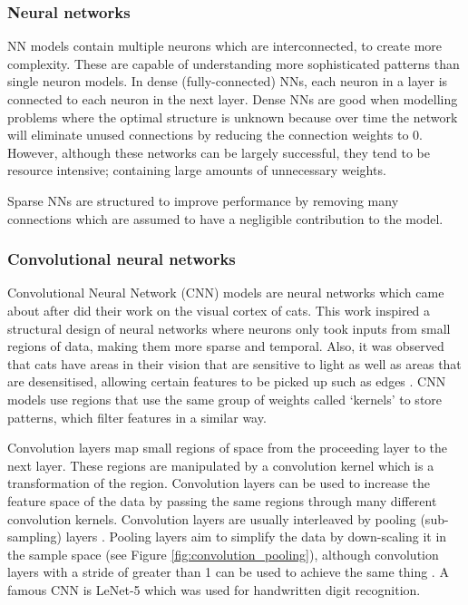 \documentclass[12pt]{article}
\begin{document}
	\subsubsection{Neural networks}
	\label{sec:neural_networks2}
	
	NN models contain multiple neurons which are interconnected, to create more complexity. These are capable of understanding more sophisticated patterns than single neuron models. In dense (fully-connected) NNs, each neuron in a layer is connected to each neuron in the next layer. Dense NNs are good when modelling problems where the optimal structure is unknown because over time the network will eliminate unused connections by reducing the connection weights to 0. However, although these networks can be largely successful, they tend to be resource intensive; containing large amounts of unnecessary weights.\medskip
	
	Sparse NNs are structured to improve performance by removing many connections which are assumed to have a negligible contribution to the model.\medskip
	
	\subsubsection{Convolutional neural networks}
	\label{sec:cnns}
	Convolutional Neural Network (CNN) models are neural networks which came about after \textcite{Hubel1959} did their work on the visual cortex of cats. This work inspired a structural design of neural networks where neurons only took inputs from small regions of data, making them more sparse and temporal. Also, it was observed that cats have areas in their vision that are sensitive to light as well as areas that are desensitised, allowing certain features to be picked up such as edges \parencite[p574]{Hubel1959}. CNN models use regions that use the same group of weights called `kernels' to store patterns, which filter features in a similar way.\medskip
	
	Convolution layers map small regions of space from the proceeding layer to the next layer. These regions are manipulated by a convolution kernel which is a transformation of the region. Convolution layers can be used to increase the feature space of the data by passing the same regions through many different convolution kernels. Convolution layers are usually interleaved by pooling (sub-sampling) layers \parencite{Lecun1998}. Pooling layers aim to simplify the data by down-scaling it in the sample space (see Figure \ref{fig:convolution_pooling}), although convolution layers with a stride of greater than 1 can be used to achieve the same thing \parencite{Springenberg2014}. A famous CNN is LeNet-5 \parencite{Lecun1998} which was used for handwritten digit recognition.\medskip
	
\end{document}

